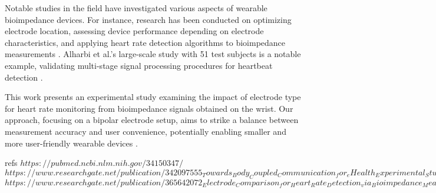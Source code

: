 {Notable studies in the field have investigated various aspects of wearable bioimpedance devices. For instance, research has been conducted on optimizing electrode location, assessing device performance depending on electrode characteristics, and applying heart rate detection algorithms to bioimpedance measurements \cite{towards, PubMedArticle, NewSource7}. Alharbi et al.'s large-scale study with 51 test subjects is a notable example, validating multi-stage signal processing procedures for heartbeat detection \cite{towards, NewSource8}.

This work presents an experimental study examining the impact of electrode type for heart rate monitoring from bioimpedance signals obtained on the wrist. Our approach, focusing on a bipolar electrode setup, aims to strike a balance between measurement accuracy and user convenience, potentially enabling smaller and more user-friendly wearable devices \cite{towards}.
}
refs{
$https://pubmed.ncbi.nlm.nih.gov/34150347/$
$https://www.researchgate.net/publication/342097555_Towards_Body_Coupled_Communication_for_eHealth_Experimental_Study_of_Human_Body_Frequency_Response$
$https://www.researchgate.net/publication/365642072_Electrode_Comparison_for_Heart_Rate_Detection_via_Bioimpedance_Measurements$}



